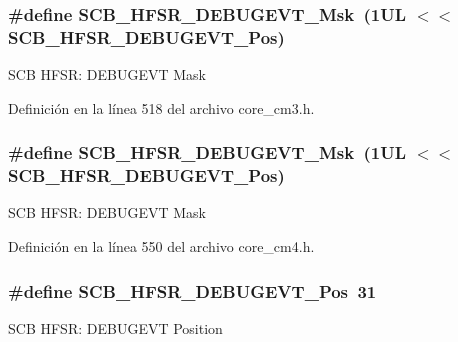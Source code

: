 \subsubsection[{\texorpdfstring{S\+C\+B\+\_\+\+H\+F\+S\+R\+\_\+\+D\+E\+B\+U\+G\+E\+V\+T\+\_\+\+Msk}{SCB_HFSR_DEBUGEVT_Msk}}]{\setlength{\rightskip}{0pt plus 5cm}\#define S\+C\+B\+\_\+\+H\+F\+S\+R\+\_\+\+D\+E\+B\+U\+G\+E\+V\+T\+\_\+\+Msk~(1\+U\+L $<$$<$ S\+C\+B\+\_\+\+H\+F\+S\+R\+\_\+\+D\+E\+B\+U\+G\+E\+V\+T\+\_\+\+Pos)}\hypertarget{group___c_m_s_i_s___s_c_b_gababd60e94756bb33929d5e6f25d8dba3}{}\label{group___c_m_s_i_s___s_c_b_gababd60e94756bb33929d5e6f25d8dba3}
S\+CB H\+F\+SR\+: D\+E\+B\+U\+G\+E\+VT Mask 

Definición en la línea 518 del archivo core\+\_\+cm3.\+h.

\subsubsection[{\texorpdfstring{S\+C\+B\+\_\+\+H\+F\+S\+R\+\_\+\+D\+E\+B\+U\+G\+E\+V\+T\+\_\+\+Msk}{SCB_HFSR_DEBUGEVT_Msk}}]{\setlength{\rightskip}{0pt plus 5cm}\#define S\+C\+B\+\_\+\+H\+F\+S\+R\+\_\+\+D\+E\+B\+U\+G\+E\+V\+T\+\_\+\+Msk~(1\+U\+L $<$$<$ S\+C\+B\+\_\+\+H\+F\+S\+R\+\_\+\+D\+E\+B\+U\+G\+E\+V\+T\+\_\+\+Pos)}\hypertarget{group___c_m_s_i_s___s_c_b_gababd60e94756bb33929d5e6f25d8dba3}{}\label{group___c_m_s_i_s___s_c_b_gababd60e94756bb33929d5e6f25d8dba3}
S\+CB H\+F\+SR\+: D\+E\+B\+U\+G\+E\+VT Mask 

Definición en la línea 550 del archivo core\+\_\+cm4.\+h.

\subsubsection[{\texorpdfstring{S\+C\+B\+\_\+\+H\+F\+S\+R\+\_\+\+D\+E\+B\+U\+G\+E\+V\+T\+\_\+\+Pos}{SCB_HFSR_DEBUGEVT_Pos}}]{\setlength{\rightskip}{0pt plus 5cm}\#define S\+C\+B\+\_\+\+H\+F\+S\+R\+\_\+\+D\+E\+B\+U\+G\+E\+V\+T\+\_\+\+Pos~31}\hypertarget{group___c_m_s_i_s___s_c_b_ga300c90cfb7b35c82b4d44ad16c757ffb}{}\label{group___c_m_s_i_s___s_c_b_ga300c90cfb7b35c82b4d44ad16c757ffb}
S\+CB H\+F\+SR\+: D\+E\+B\+U\+G\+E\+VT Position 

